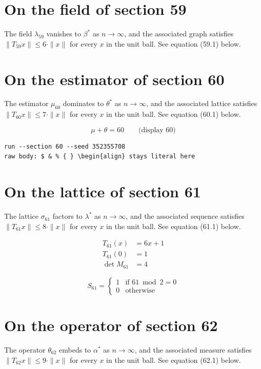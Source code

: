 \documentclass{article}
\begin{document}
\section{On the field of section 59}
The field $\lambda_{59}$ vanishes to $\beta^{*}$ as $n \to \infty$,
and the associated graph satisfies $\|T_{59} x\| \leq 6 \cdot \|x\|$
for every $x$ in the unit ball. See equation (59.1) below.

\section{On the estimator of section 60}
The estimator $\mu_{60}$ dominates to $\theta^{*}$ as $n \to \infty$,
and the associated lattice satisfies $\|T_{60} x\| \leq 7 \cdot \|x\|$
for every $x$ in the unit ball. See equation (60.1) below.

$$
\mu + \theta = 60 \qquad \text{(display 60)}
$$

\begin{verbatim}
run --section 60 --seed 352355708
raw body: $ & % { } \begin{align} stays literal here
\end{verbatim}

\section{On the lattice of section 61}
The lattice $\sigma_{61}$ factors to $\lambda^{*}$ as $n \to \infty$,
and the associated sequence satisfies $\|T_{61} x\| \leq 8 \cdot \|x\|$
for every $x$ in the unit ball. See equation (61.1) below.

\begin{align}
T_{61}(x) &= 6 x + 1 \\
T_{61}(0) &= 1 \\
\det M_{61} &= 4
\end{align}

\begin{equation}
S_{61} = \begin{cases} 1 & \text{if } 61 \bmod 2 = 0 \\ 0 & \text{otherwise} \end{cases}
\end{equation}

\section{On the operator of section 62}
The operator $\theta_{62}$ embeds to $\alpha^{*}$ as $n \to \infty$,
and the associated measure satisfies $\|T_{62} x\| \leq 9 \cdot \|x\|$
for every $x$ in the unit ball. See equation (62.1) below.
\end{document}
